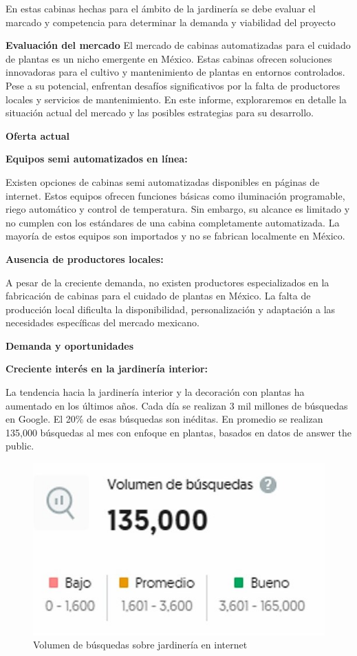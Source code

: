 En estas cabinas hechas para el ámbito de la jardinería se debe evaluar el marcado y competencia para determinar la demanda y viabilidad del proyecto

\textbf{Evaluación del mercado}
El mercado de cabinas automatizadas para el cuidado de plantas es un nicho emergente en México. Estas cabinas ofrecen soluciones innovadoras para el cultivo y mantenimiento de plantas en entornos controlados. Pese a su potencial, enfrentan desafíos significativos por la falta de productores locales y servicios de mantenimiento. En este informe, exploraremos en detalle la situación actual del mercado y las posibles estrategias para su desarrollo.


\textbf{Oferta actual}

\textbf{Equipos semi automatizados en línea:}

Existen opciones de cabinas semi automatizadas disponibles en páginas de internet. Estos equipos ofrecen funciones básicas como iluminación programable, riego automático y control de temperatura. Sin embargo, su alcance es limitado y no cumplen con los estándares de una cabina completamente automatizada.
La mayoría de estos equipos son importados y no se fabrican localmente en México.

\textbf{Ausencia de productores locales:}

A pesar de la creciente demanda, no existen productores especializados en la fabricación de cabinas para el cuidado de plantas en México.
La falta de producción local dificulta la disponibilidad, personalización y adaptación a las necesidades específicas del mercado mexicano.

\textbf{Demanda y oportunidades}

\textbf{Creciente interés en la jardinería interior:}

La tendencia hacia la jardinería interior y la decoración con plantas ha aumentado en los últimos años. Cada día se realizan 3 mil millones de búsquedas en Google. El 20\% de esas búsquedas son inéditas. En promedio se realizan 135,000 búsquedas al mes con enfoque en plantas, basados en datos de answer the public.

\begin{figure}[H]
    \centering	
    \includegraphics[width=.4\textwidth]{img/Empresa/VolumenBusquedas.jpg} 
    \caption{Volumen de búsquedas sobre jardinería en internet}
\label{fig:GraficaProyeccionDemanda}
\end{figure}

